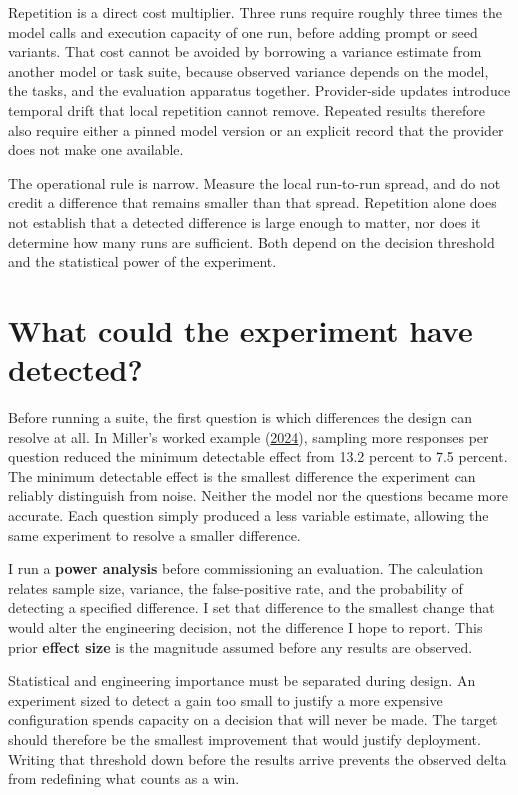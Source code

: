 Repetition is a direct cost multiplier. Three runs require roughly three times the model calls and execution capacity of one run, before adding prompt or seed variants. That cost cannot be avoided by borrowing a variance estimate from another model or task suite, because observed variance depends on the model, the tasks, and the evaluation apparatus together. Provider-side updates introduce temporal drift that local repetition cannot remove. Repeated results therefore also require either a pinned model version or an explicit record that the provider does not make one available.

The operational rule is narrow. Measure the local run-to-run spread, and do not credit a difference that remains smaller than that spread. Repetition alone does not establish that a detected difference is large enough to matter, nor does it determine how many runs are sufficient. Both depend on the decision threshold and the statistical power of the experiment.

\section{What could the experiment have detected?}\label{what-could-the-experiment-have-detected}

Before running a suite, the first question is which differences the design can resolve at all. In Miller's worked example (\href{https://arxiv.org/abs/2411.00640}{2024}), sampling more responses per question reduced the minimum detectable effect from 13.2 percent to 7.5 percent. The minimum detectable effect is the smallest difference the experiment can reliably distinguish from noise. Neither the model nor the questions became more accurate. Each question simply produced a less variable estimate, allowing the same experiment to resolve a smaller difference.

I run a \textbf{power analysis} before commissioning an evaluation. The calculation relates sample size, variance, the false-positive rate, and the probability of detecting a specified difference. I set that difference to the smallest change that would alter the engineering decision, not the difference I hope to report. This prior \textbf{effect size} is the magnitude assumed before any results are observed.

Statistical and engineering importance must be separated during design. An experiment sized to detect a gain too small to justify a more expensive configuration spends capacity on a decision that will never be made. The target should therefore be the smallest improvement that would justify deployment. Writing that threshold down before the results arrive prevents the observed delta from redefining what counts as a win.

